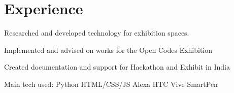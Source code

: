 \documentclass[a4paper]{deedy-resume} %
\begin{document}

\lastupdated %



\begin{minipage}[t]{0.66\textwidth} %



  \section{Experience}


  \vspace{\topsep} %
  \begin{tightitemize}
  \item Researched and developed technology for exhibition spaces.
  \item Implemented and advised on works for the Open Codes Exhibition
  \item Created documentation and support for Hackathon and Exhibit in India
  \end{tightitemize}
  Main tech used: \textbullet{} Python \textbullet{} HTML/CSS/JS \textbullet{} Alexa \textbullet{} HTC Vive \textbullet{} SmartPen \textbullet{}

  \sectionspace %




\end{minipage}
\end{document}
